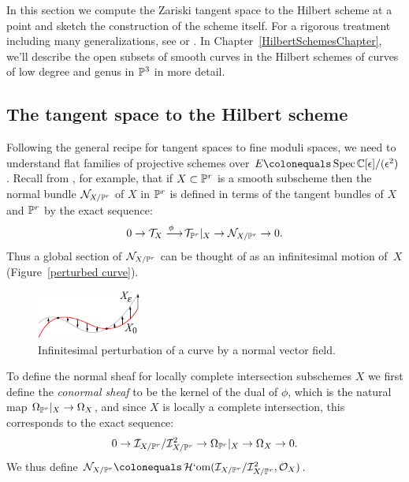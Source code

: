 In this section
we
compute
the Zariski tangent space to the Hilbert scheme at a point and
%
%
sketch the construction of the scheme itself. For a rigorous
treatment including many generalizations,  see \cite{HomogHilbert}
or \cite{MR2222646}. In Chapter~\ref{HilbertSchemesChapter}, we'll
describe  the
open subsets of smooth curves in the Hilbert schemes of curves of low
degree and genus in $\PP^3$ in more detail.

\subsection[The tangent space to the Hilbert scheme]{\hskip-3pt The tangent space to the Hilbert scheme}

Following the general recipe for tangent spaces to fine moduli spaces,
we need to understand
flat families
%
of projective schemes over $E \colonequals  \Spec
\CC[\eps]/(\eps^2)$. Recall
from
\cite[p.\,182]{Hartshorne1977},
for example,
that if
$X\subset \PP^r$ is a smooth subscheme then
 the normal bundle $\sN_{X/\PP^r}$ of $X$ in $\PP^r$ is defined in terms
 of the tangent bundles
 of $X$ and $\PP^r$ by the exact sequence:
$$
0\to \sT_X \ruto {\phi} \sT_{\PP^r}|_X \to \sN_{X/\PP^r} \to 0.
$$
Thus a global section of
$\sN_{X/\PP^r}$
%
can be thought of as an infinitesimal motion of~$X$ (Figure~\ref{perturbed
curve}).

\begin{figure}
\centerline {\includegraphics[width=1.35in]{main/Fig06-0-new}}
\vskip-5pt
 \caption{Infinitesimal perturbation of a curve by a normal vector field.}
 \label{perturbed curve}
\end{figure}

To define the normal sheaf for locally complete intersection subschemes
$X$ we first define the
\emph{conormal sheaf}
%
to be the kernel of the dual  of $\phi$, which is the natural map
$\Omega_{\PP^r}|_X \to \Omega_X$,
and since $X$ is locally a complete intersection, this corresponds to
the exact sequence:
$$
0\to \sI_{X/\PP^r}/\sI_{X/\PP^r}^2 \to \Omega_{\PP^r}|_X \to \Omega_X
\to 0.
$$
We thus define $\sN_{X/\PP^r} \colonequals
\sHom(\sI_{X/\PP^r}/\sI_{X/\PP^r}^2, \sO_X)$.

